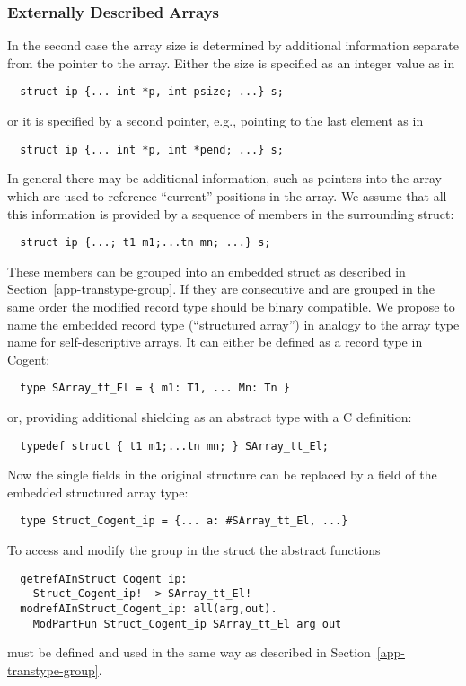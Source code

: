 \subsubsection{Externally Described Arrays}

In the second case the array size is determined by additional information separate from the pointer to the array.
Either the size is specified as an integer value as in 
\begin{verbatim}
  struct ip {... int *p, int psize; ...} s;
\end{verbatim}
or it is specified by a second pointer, e.g., pointing to the last element as in
\begin{verbatim}
  struct ip {... int *p, int *pend; ...} s;
\end{verbatim}
In general there may be additional information, such as pointers into the array which are used to reference
``current'' positions in the array. We assume that all this information is provided by a sequence of members
in the surrounding struct:
\begin{verbatim}
  struct ip {...; t1 m1;...tn mn; ...} s;
\end{verbatim}

These members can be grouped into an embedded struct as described in Section~\ref{app-transtype-group}. If they
are consecutive and are grouped in the same order the modified record type should be binary compatible.
We propose to name the embedded record type  (``structured array'') in analogy to the
array type name for self-descriptive arrays. It can either be defined as a record type in Cogent:
\begin{verbatim}
  type SArray_tt_El = { m1: T1, ... Mn: Tn }
\end{verbatim}
or, providing additional shielding as an abstract type with a C definition:
\begin{verbatim}
  typedef struct { t1 m1;...tn mn; } SArray_tt_El;
\end{verbatim}

Now the single fields in the original structure can be replaced by a field of the embedded structured array type:
\begin{verbatim}
  type Struct_Cogent_ip = {... a: #SArray_tt_El, ...}
\end{verbatim}

To access and modify the group in the struct the abstract functions
\begin{verbatim}
  getrefAInStruct_Cogent_ip: 
    Struct_Cogent_ip! -> SArray_tt_El!
  modrefAInStruct_Cogent_ip: all(arg,out). 
    ModPartFun Struct_Cogent_ip SArray_tt_El arg out 
\end{verbatim}
must be defined and used in the same way as described in Section~\ref{app-transtype-group}.

